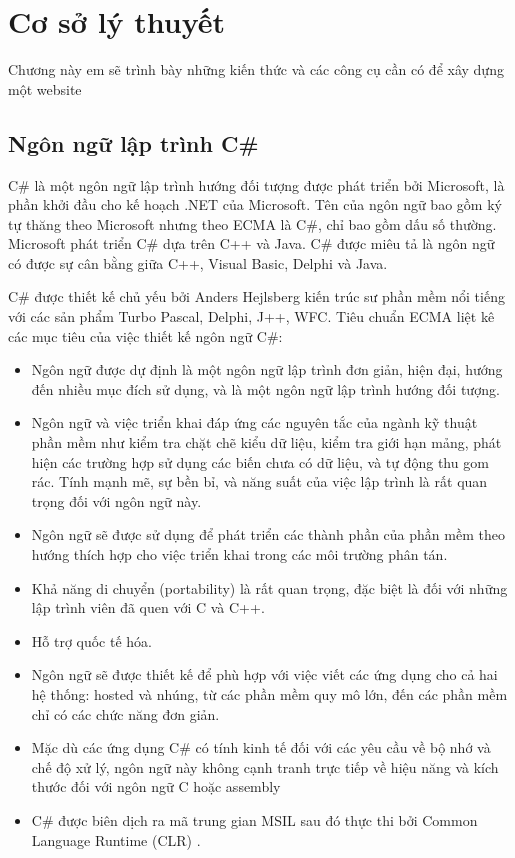 \chapter{Cơ sở lý thuyết}
\label{chapter2}
Chương này em sẽ trình bày những kiến thức và các công cụ cần có để xây dựng một website
\section{Ngôn ngữ lập trình C\# } \label{ngonngu} 
C\# là một ngôn ngữ lập trình hướng đối tượng được phát triển bởi Microsoft, là phần khởi đầu cho kế hoạch .NET của Microsoft. Tên của ngôn ngữ bao gồm ký tự thăng theo Microsoft nhưng theo ECMA là C\#, chỉ bao gồm dấu số thường. Microsoft phát triển C\# dựa trên C++ và Java. C\# được miêu tả là ngôn ngữ có được sự cân bằng giữa C++, Visual Basic, Delphi và Java.
\par
C\# được thiết kế chủ yếu bởi Anders Hejlsberg kiến trúc sư phần mềm nổi tiếng với các sản phẩm Turbo Pascal, Delphi, J++, WFC.
Tiêu chuẩn ECMA liệt kê các mục tiêu của việc thiết kế ngôn ngữ C\#:
\begin{itemize}
\item Ngôn ngữ được dự định là một ngôn ngữ lập trình đơn giản, hiện đại, hướng đến nhiều mục đích sử dụng, và là một ngôn ngữ lập trình hướng đối tượng.
\item Ngôn ngữ và việc triển khai đáp ứng các nguyên tắc của ngành kỹ thuật phần mềm như kiểm tra chặt chẽ kiểu dữ liệu, kiểm tra giới hạn mảng, phát hiện các trường hợp sử dụng các biến chưa có dữ liệu, và tự động thu gom rác. Tính mạnh mẽ, sự bền bỉ, và năng suất của việc lập trình là rất quan trọng đối với ngôn ngữ này.
\item Ngôn ngữ sẽ được sử dụng để phát triển các thành phần của phần mềm theo hướng thích hợp cho việc triển khai trong các môi trường phân tán.
\item Khả năng di chuyển (portability) là rất quan trọng, đặc biệt là đối với những lập trình viên đã quen với C và C++.
\item Hỗ trợ quốc tế hóa.
\item Ngôn ngữ sẽ được thiết kế để phù hợp với việc viết các ứng dụng cho cả hai hệ thống: hosted và nhúng, từ các phần mềm quy mô lớn, đến các phần mềm chỉ có các chức năng đơn giản.
\item Mặc dù các ứng dụng C\# có tính kinh tế đối với các yêu cầu về bộ nhớ và chế độ xử lý, ngôn ngữ này không cạnh tranh trực tiếp về hiệu năng và kích thước đối với ngôn ngữ C hoặc assembly
\item C\# được biên dịch ra mã trung gian MSIL sau đó thực thi bởi Common Language Runtime (CLR) \cite{2}.
\end{itemize}
